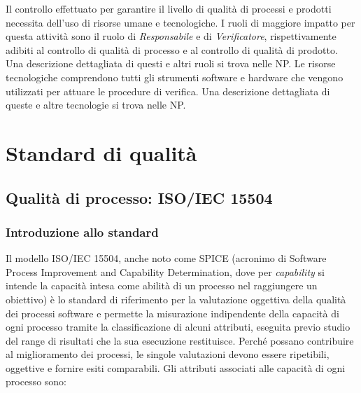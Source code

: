 \documentclass[openany,12pt,a4paper]{report}
\begin{document}
Il controllo effettuato per garantire il livello di qualità di processi e prodotti necessita dell'uso di risorse umane e tecnologiche. I ruoli di maggiore impatto per questa attività sono il ruolo di \textit{Responsabile} e di \textit{Verificatore}, rispettivamente adibiti al controllo di qualità di processo e al controllo di qualità di prodotto. Una descrizione dettagliata di questi e altri ruoli si trova nelle NP.
Le risorse tecnologiche comprendono tutti gli strumenti software e hardware che vengono utilizzati per attuare le procedure di verifica. Una descrizione dettagliata di queste e altre tecnologie si trova nelle NP.

\appendix


\chapter{Standard di qualità}


\section{Qualità di processo: ISO/IEC 15504}

\subsection{Introduzione allo standard}

Il modello ISO/IEC 15504, anche noto come SPICE (acronimo di Software Process Improvement and Capability Determination, dove per \textit{capability} si intende la capacità intesa come abilità di un processo nel raggiungere un obiettivo) è lo standard di riferimento per la valutazione oggettiva della qualità dei processi software e permette la misurazione indipendente della capacità di ogni processo tramite la classificazione di alcuni attributi, eseguita previo studio del range di risultati che la sua esecuzione restituisce. Perché possano contribuire al miglioramento dei processi, le singole valutazioni devono essere ripetibili, oggettive e fornire esiti comparabili. Gli attributi associati alle capacità di ogni processo sono:
\end{document}
